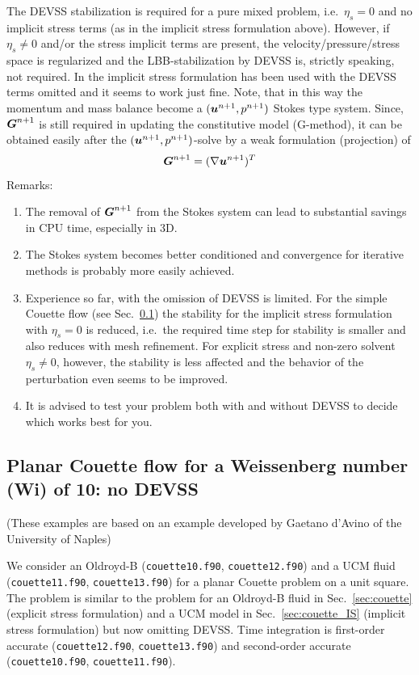 The DEVSS stabilization is required for a pure mixed problem,
i.e.\ $\eta_s=0$ and no implicit stress terms (as in the implicit stress formulation above). However, if $\eta_s\neq0$
and/or the stress implicit terms are present, the velocity/pressure/stress space is regularized and the LBB-stabilization by DEVSS is, strictly speaking, not required. In \cite{Baltussen2010} the implicit stress formulation has been used with the DEVSS terms omitted and it seems to work just fine. Note, that in this way the momentum  and mass balance become a $(\boldsymbol{u}^{n+1},p^{n+1})$ Stokes type system. Since, $\boldsymbol{G}^{n+1}$ is still required in updating the constitutive model (G-method), it can be obtained easily after the $(\boldsymbol{u}^{n+1},p^{n+1})$-solve by 
a weak formulation (projection) of 
\[
   \boldsymbol{G}^{n+1} = (\nabla\boldsymbol{u}^{n+1})^T
\]
Remarks:
\begin{enumerate}
   \item The removal of $\boldsymbol{G}^{n+1}$ from the Stokes system can lead to substantial savings in CPU time, especially in 3D.
   \item The Stokes system becomes better conditioned and convergence for iterative methods is probably more easily achieved.
   \item Experience so far, with the omission of DEVSS is limited. For the simple Couette flow (see Sec.~\ref{sec:couette_nodevss})  the stability for 
   the implicit stress formulation
   with $\eta_s=0$ is reduced, i.e.\ the required time step for stability is smaller and also reduces with mesh refinement. For explicit stress and non-zero solvent $\eta_s\neq0$, however, the stability is less affected and the behavior of the perturbation even seems to be improved. 
   \item It is advised to test your problem both with and without DEVSS to decide which works best for you.
\end{enumerate}

\subsection{Planar Couette flow for a Weissenberg number (Wi) of 10: no DEVSS}
\label{sec:couette_nodevss}

(These examples are based on an example developed by Gaetano d'Avino of 
the University of Naples)

We consider an Oldroyd-B (\texttt{couette10.f90}, \texttt{couette12.f90}) and a UCM fluid (\texttt{couette11.f90},
\texttt{couette13.f90})
for a planar Couette problem on a unit square.
The problem is similar to the problem for an Oldroyd-B fluid in
Sec.~\ref{sec:couette} (explicit stress formulation) and a UCM model in Sec.~\ref{sec:couette_IS} (implicit stress formulation) but now omitting DEVSS. Time integration is first-order accurate (\texttt{couette12.f90},
\texttt{couette13.f90}) and second-order accurate (\texttt{couette10.f90},
\texttt{couette11.f90}).



